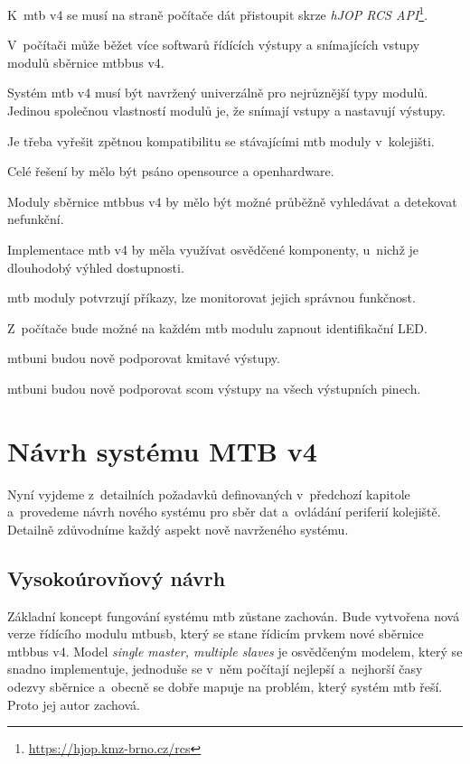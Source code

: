 \begin{compactenum}
\item K~\gls{mtb} v4 se musí na straně počítače dát přistoupit skrze
	\textit{hJOP RCS API}\footnote{\url{https://hjop.kmz-brno.cz/rcs}}.
\item V~počítači může běžet více softwarů řídících výstupy a snímajících vstupy
	modulů sběrnice \gls{mtbbus} v4.
\item Systém \gls{mtb} v4 musí být navržený univerzálně pro nejrůznější typy
	modulů. Jedinou společnou vlastností modulů je, že snímají vstupy a nastavují
	výstupy.
\item Je třeba vyřešit zpětnou kompatibilitu se stávajícími \gls{mtb} moduly
	v~kolejišti.
\item Celé řešení by mělo být psáno opensource a openhardware.
\item Moduly sběrnice \gls{mtbbus} v4 by mělo být možné průběžně vyhledávat
	a detekovat nefunkční.
\item Implementace \gls{mtb} v4 by měla využívat osvědčené komponenty, u~nichž
	je dlouhodobý výhled dostupnosti.
\item \gls{mtb} moduly potvrzují příkazy, lze monitorovat jejich správnou funkčnost.
\item Z~počítače bude možné na každém \gls{mtb} modulu zapnout identifikační LED.
\item \gls{mtbuni} budou nově podporovat kmitavé výstupy.
\item \gls{mtbuni} budou nově podporovat \gls{scom} výstupy na všech
	výstupních pinech.
\end{compactenum}


\section{Návrh systému MTB v4}

Nyní vyjdeme z~detailních požadavků definovaných v~předchozí kapitole
a~provedeme návrh nového systému pro sběr dat a~ovládání periferií kolejiště.
Detailně zdůvodníme každý aspekt nově navrženého systému.

\subsection{Vysokoúrovňový návrh}

Základní koncept fungování systému \gls{mtb}  zůstane zachován. Bude vytvořena nová verze řídícího modulu
\gls{mtbusb}, který se stane řídicím prvkem nové sběrnice \gls{mtbbus} v4.
Model \textit{single master, multiple slaves} je osvědčeným modelem, který se
snadno implementuje, jednoduše se v~něm počítají nejlepší a~nejhorší časy odezvy
sběrnice a~obecně se dobře mapuje na problém, který systém \gls{mtb} řeší.
Proto jej autor zachová.

